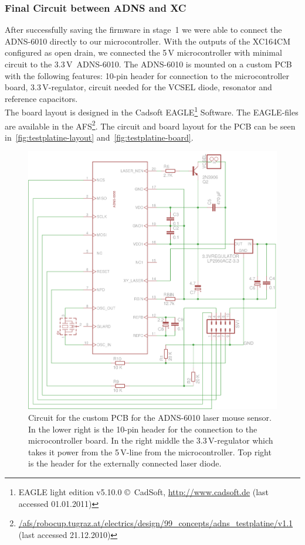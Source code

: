 \documentclass[12pt,a4paper]{article}
\begin{document}

\subsubsection{Final Circuit between ADNS and XC}
\label{adns-pcb}

After successfully saving the firmware in stage~1 we were able to connect the ADNS-6010 directly to our microcontroller.
With the outputs of the XC164CM configured as open drain, we connected the 5\,V microcontroller with minimal circuit to the 3.3\,V~ADNS-6010.
The ADNS-6010 is mounted on a custom PCB with the following features: 
10-pin header for connection to the microcontroller board,
\hbox{3.3\,V-regulator},
circuit needed for the VCSEL diode,
resonator and reference capacitors.\\
The board layout is designed in the Cadsoft EAGLE\footnote{EAGLE light edition v5.10.0 \copyright~CadSoft, \url{http://www.cadsoft.de} (last accessed 01.01.2011)} Software.
The EAGLE-files are available in the AFS\footnote{\url{/afs/robocup.tugraz.at/electrics/design/99_concepts/adns_testplatine/v1.1} (last accessed 21.12.2010)}.
The circuit and board layout for the PCB can be seen in~\autoref{fig:testplatine-layout} and~\autoref{fig:testplatine-board}.

\begin{figure}[htbp]
\begin{center}
\includegraphics[width=1\columnwidth]{figures/schaltplan.png}
\caption{\label{fig:testplatine-layout}
Circuit for the custom PCB for the ADNS-6010 laser mouse sensor.
In the lower right is the 10-pin header for the connection to the microcontroller board.
In the right middle the 3.3\,V-regulator which takes it power from the 5\,V-line from the microcontroller.
Top right is the header for the externally connected laser diode.
}
\end{center}
\end{figure}
\end{document}
